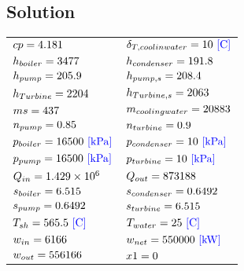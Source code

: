 \documentclass[10pt,fleqn]{article}
\newcommand{\V}[1]{\mbox{$ #1 $}}
\begin{document}
\subsection*{Solution}
\setlength\LTleft{0pt}
\setlength\LTright{0pt}
\begin{longtable}{ll}
${\V{cp}  =4.181 \rm}$ & 
${\delta _{T,coolinwater} =10 \rm\ {\color{blue} \left[C\right]}}$ \\
${h_{boiler} =3477 \rm}$ & 
${h_{condenser} =191.8 \rm}$ \\
${h_{pump} =205.9 \rm}$ & 
${h_{pump,s} =208.4 \rm}$ \\
${h_{Turbine} =2204 \rm}$ & 
${h_{Turbine,s} =2063 \rm}$ \\
${\V{ms}  =437 \rm}$ & 
${m_{coolingwater} =20883 \rm}$ \\
${n_{pump} =0.85 \rm}$ & 
${n_{turbine} =0.9 \rm}$ \\
${p_{boiler} =16500 \rm\ {\color{blue} \left[kPa\right]}}$ & 
${p_{condenser} =10 \rm\ {\color{blue} \left[kPa\right]}}$ \\
${p_{pump} =16500 \rm\ {\color{blue} \left[kPa\right]}}$ & 
${p_{turbine} =10 \rm\ {\color{blue} \left[kPa\right]}}$ \\
${Q_{in} =1.429\times 10^{6} \rm}$ & 
${Q_{out} =873188 \rm}$ \\
${s_{boiler} =6.515 \rm}$ & 
${s_{condenser} =0.6492 \rm}$ \\
${s_{pump} =0.6492 \rm}$ & 
${s_{turbine} =6.515 \rm}$ \\
${T_{sh} =565.5 \rm\ {\color{blue} \left[C\right]}}$ & 
${T_{water} =25 \rm\ {\color{blue} \left[C\right]}}$ \\
${w_{in} =6166 \rm}$ & 
${w_{net} =550000 \rm\ {\color{blue} \left[kW\right]}}$ \\
${w_{out} =556166 \rm}$ & 
${\V{x1}  =0 \rm}$\end{longtable}
\end{document}
